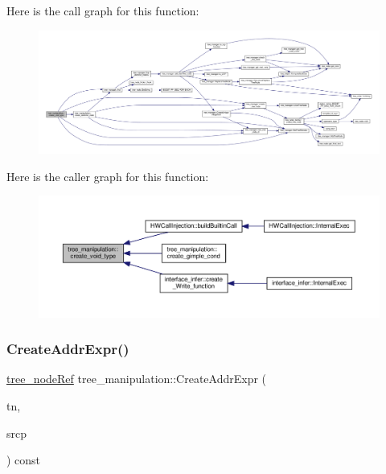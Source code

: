Here is the call graph for this function\+:
\nopagebreak
\begin{figure}[H]
\begin{center}
\leavevmode
\includegraphics[width=350pt]{d0/d99/classtree__manipulation_a24c0fffd668717617bebb2f4bce4a485_cgraph}
\end{center}
\end{figure}
Here is the caller graph for this function\+:
\nopagebreak
\begin{figure}[H]
\begin{center}
\leavevmode
\includegraphics[width=350pt]{d0/d99/classtree__manipulation_a24c0fffd668717617bebb2f4bce4a485_icgraph}
\end{center}
\end{figure}
\mbox{\label{classtree__manipulation_a6068b421c1c225d1f7cc01cb354b950d}} 
\subsubsection{\texorpdfstring{Create\+Addr\+Expr()}{CreateAddrExpr()}}
{\footnotesize\ttfamily \hyperlink{tree__node_8hpp_a6ee377554d1c4871ad66a337eaa67fd5}{tree\+\_\+node\+Ref} tree\+\_\+manipulation\+::\+Create\+Addr\+Expr (\begin{DoxyParamCaption}\item[{const \hyperlink{tree__node_8hpp_a3cf5d02292c940f3892425a5b5fdec3c}{tree\+\_\+node\+Const\+Ref} \&}]{tn,  }\item[{const std\+::string \&}]{srcp }\end{DoxyParamCaption}) const}



